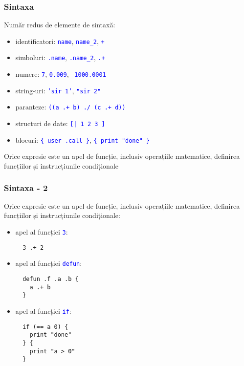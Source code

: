 \documentclass{beamer}
\renewcommand{\c}[1]{\textcolor{blue}{\texttt{#1}}}
\begin{document}
\begin{frame}
  \frametitle{Sintaxa}
  Număr redus de elemente de sintaxă:
  \begin{itemize}
  \item identificatori: \c{name}, \c{name\_2}, \c{+}
  \item simboluri: \c{.name}, \c{.name\_2}, \c{.+}
  \item numere: \c{7}, \c{0.009}, \c{-1000.0001}
  \item string-uri: \c{'sir 1'}, \c{"sir 2"}
  \item paranteze: \c{((a .+ b) ./ (c .+ d))}
  \item structuri de date: \c{[| 1 2 3 ]}
  \item blocuri: \c{\{ user .call \}}, \c{\{ print "done" \}}
  \end{itemize}
  \vskip8pt
  Orice expresie este un apel de funcție, inclusiv operațiile matematice, definirea funcțiilor și instrucțiunile condiționale
\end{frame}

\begin{frame}[containsverbatim]
  \frametitle{Sintaxa - 2}
  Orice expresie este un apel de funcție, inclusiv operațiile matematice, definirea funcțiilor și instrucțiunile condiționale:
  \begin{itemize}
    \item
      apel al funcției \c{3}:
      \color{blue}
      \begin{verbatim}
  3 .+ 2      \end{verbatim}
      \color{black}
    \item
      apel al funcției \c{defun}:
      \color{blue}
      \begin{verbatim}
  defun .f .a .b { 
    a .+ b
  }  \end{verbatim}
      \color{black}
    \item
      apel al funcției \c{if}:
      \color{blue}
      \begin{verbatim}
  if (== a 0) { 
    print "done"
  } {
    print "a > 0"
  }      \end{verbatim}
      \color{black}

  \end{itemize}
\end{frame}
\end{document}
